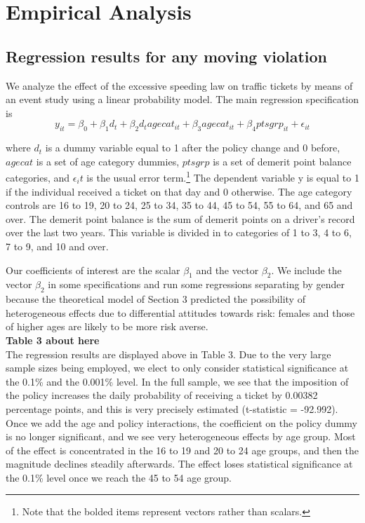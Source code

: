 \section{Empirical Analysis}
\label{sec:Empirical}


\subsection{Regression results for any moving violation}

We analyze the effect of the excessive speeding law on traffic tickets by means of an event study using a linear probability model. The main regression specification is
\begin{equation}
y_{it} = \beta_0 + \beta_1 d_t
      + \beta_2 d_t agecat_{it} + \beta_3 agecat_{it} + \beta_4 ptsgrp_{it}
      + \epsilon_{it}
\end{equation}

where $d_t$ is a dummy variable equal to 1 after the policy change and 0 before, $agecat$ is a set of age category dummies, $ptsgrp$ is a set of demerit point balance categories, and $\epsilon_it$ is the usual error term.\footnote{%
Note that the bolded items represent vectors rather than scalars.
}  
The dependent variable y is equal to 1 if the individual received a ticket on that day and 0 otherwise. The age category controls are 16 to 19, 20 to 24, 25 to 34, 35 to 44, 45 to 54, 55 to 64, and 65 and over. The demerit point balance is the sum of demerit points on a driver’s record over the last two years. This variable is divided in to categories of 1 to 3, 4 to 6, 7 to 9, and 10 and over.

Our coefficients of interest are the scalar $\beta_1$ and the vector $\beta_2$. We include the vector $\beta_2$ in some specifications and run some regressions separating by gender because the theoretical model of Section 3 predicted the possibility of heterogeneous effects due to differential attitudes towards risk: females and those of higher ages are likely to be more risk averse. \\

\textbf{Table 3 about here} \\

The regression results are displayed above in Table 3. Due to the very large sample sizes being employed, we elect to only consider statistical significance at the 0.1\% and the 0.001\% level. In the full sample, we see that the imposition of the policy increases the daily probability of receiving a ticket by 0.00382 percentage points, and this is very precisely estimated (t-statistic = -92.992). Once we add the age and policy interactions, the coefficient on the policy dummy is no longer significant, and we see very heterogeneous effects by age group. Most of the effect is concentrated in the 16 to 19 and 20 to 24 age groups, and then the magnitude declines steadily afterwards. The effect loses statistical significance at the 0.1\% level once we reach the 45 to 54 age group.

